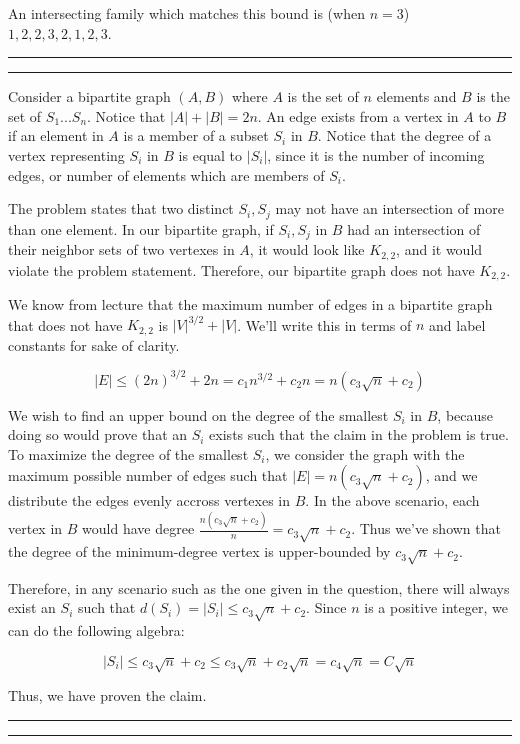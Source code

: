 \documentclass[11pt,letterpaper]{article}
\newcommand{\question}[1] {\vspace{.25in} \hrule\vspace{0.5em}
\noindent{\bf #1} \vspace{0.5em}
\hrule \vspace{.10in}}
\begin{document}
An intersecting family which matches this bound is (when $n=3$) ${ {1,2}, {2,3}, {2}, {1,2,3} }$.

\question{5}

Consider a bipartite graph $(A,B)$ where $A$ is the set of $n$ elements and $B$ is the set of $S_1...S_n$. Notice that $|A| + |B| = 2n$.
An edge exists from a vertex in $A$ to $B$ if an element in $A$ is a member of a subset $S_i$ in $B$. Notice that the degree of a vertex representing $S_i$ in $B$ is equal to $|S_i|$, since it is the number of incoming edges, or number of elements which are members of $S_i$.

The problem states that two distinct $S_i, S_j$ may not have an intersection of more than one element.
In our bipartite graph, if $S_i, S_j$ in $B$ had an intersection of their neighbor sets of two vertexes in $A$, it would look like $K_{2,2}$,
and it would violate the problem statement. Therefore, our bipartite graph does not have $K_{2,2}$.

We know from lecture that the maximum number of edges in a bipartite graph that does not have $K_{2,2}$ is $|V|^{3/2} + |V|$. We'll write this in terms of $n$ and label constants for sake of clarity.

$$ |E| \leq (2n)^{3/2} + 2n = c_1 n^{3/2} + c_2n = n(c_3 \sqrt{n} + c_2) $$

We wish to find an upper bound on the degree of the smallest $S_i$ in $B$, because doing so would prove that an $S_i$ exists such that the claim in the problem is true.
To maximize the degree of the smallest $S_i$, we consider the graph with the maximum possible number of edges such that $|E| = n(c_3 \sqrt{n} + c_2)$, and we distribute the edges evenly accross vertexes in $B$.
In the above scenario, each vertex in $B$ would have degree $\frac{n(c_3 \sqrt{n} + c_2)}{n} = c_3 \sqrt{n} + c_2$. Thus we've shown that the degree of the minimum-degree vertex is upper-bounded by $c_3 \sqrt{n} + c_2$.

Therefore, in any scenario such as the one given in the question, there will always exist an $S_i$ such that $d(S_i) = |S_i| \leq c_3 \sqrt{n} + c_2$.
Since $n$ is a positive integer, we can do the following algebra:

$$|S_i| \leq c_3 \sqrt{n} + c_2 \leq c_3 \sqrt{n} + c_2 \sqrt{n} = c_4 \sqrt{n} = C \sqrt{n}$$

Thus, we have proven the claim.


\question{6}
\end{document}
